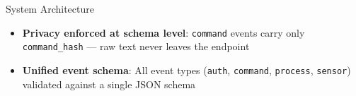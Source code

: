 \documentclass[10pt, aspectratio=169]{beamer}
\begin{document}
\begin{frame}{System Architecture}
\begin{center}
{
    }%
  \end{center}
  \vspace{2pt}
  \begin{itemize}\small
    \item \textbf{Privacy enforced at schema level}: \texttt{command} events carry only \texttt{command\_hash} — raw text never leaves the endpoint
    \item \textbf{Unified event schema}: All event types (\texttt{auth}, \texttt{command}, \texttt{process}, \texttt{sensor}) validated against a single JSON schema
  \end{itemize}
\end{frame}
\end{document}
